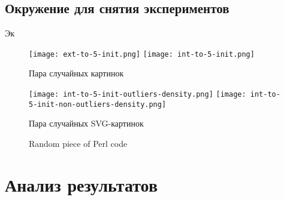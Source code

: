 \subsection{Окружение для снятия экспериментов}

Эк

\clearpage

\begin{figure}[H]
    \texttt{[image: ext-to-5-init.png]}
    \texttt{[image: int-to-5-init.png]} \label{length_entropy}
    \caption{Пара случайных картинок}
\end{figure}

\begin{figure}[H]
    \texttt{[image: int-to-5-init-outliers-density.png]}
    \texttt{[image: int-to-5-init-non-outliers-density.png]} \label{length_entropy}
    \caption{Пара случайных SVG-картинок}
\end{figure}

\begin{figure}
    
    \caption{Random piece of Perl code}
\end{figure}

\clearpage

\section{Анализ результатов}

\clearpage
